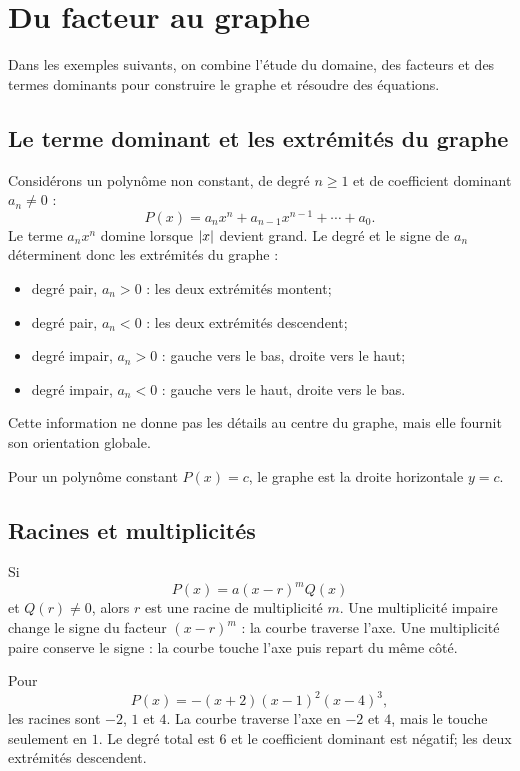 \section{Du facteur au graphe}
\label{manual:section:05.04}

Dans les exemples suivants, on combine l'étude du domaine, des facteurs et des termes dominants pour construire le graphe et résoudre des équations.

\subsection{Le terme dominant et les extrémités du graphe}

Considérons un polynôme non constant, de degré $n\ge1$ et de coefficient dominant $a_n\ne0$ :
\[
P(x)=a_nx^n+a_{n-1}x^{n-1}+\cdots+a_0.
\]
Le terme $a_nx^n$ domine lorsque $\left\lvert x\right\rvert$ devient grand. Le degré et le signe de $a_n$ déterminent donc les extrémités du graphe :
\begin{itemize}
\item degré pair, $a_n>0$ : les deux extrémités montent;
\item degré pair, $a_n<0$ : les deux extrémités descendent;
\item degré impair, $a_n>0$ : gauche vers le bas, droite vers le haut;
\item degré impair, $a_n<0$ : gauche vers le haut, droite vers le bas.
\end{itemize}

Cette information ne donne pas les détails au centre du graphe, mais elle fournit son orientation globale.

Pour un polynôme constant $P(x)=c$, le graphe est la droite horizontale $y=c$.

\subsection{Racines et multiplicités}

Si
\[
P(x)=a(x-r)^mQ(x)
\]
et $Q(r)\neq0$, alors $r$ est une racine de multiplicité $m$. Une multiplicité impaire change le signe du facteur $(x-r)^m$ : la courbe traverse l'axe. Une multiplicité paire conserve le signe : la courbe touche l'axe puis repart du même côté.

\begin{examplebox}
Pour
\[
P(x)=-(x+2)(x-1)^2(x-4)^3,
\]
les racines sont $-2$, $1$ et $4$. La courbe traverse l'axe en $-2$ et $4$, mais le touche seulement en $1$. Le degré total est $6$ et le coefficient dominant est négatif; les deux extrémités descendent.
\end{examplebox}

